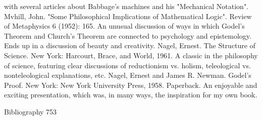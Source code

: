   with several articles about Babbage's machines and his "Mechanical Notation".
Mvhill, John. "Some Philosophical Implications of Mathematical Logic". Review of
  Metaphysics 6 (1952): 165. An unusual discussion of ways in which Godel's Theorem
  and Church's Theorem are connected to psychology and epistemology. Ends up in a
  discussion of beauty and creativity.
Nagel, Ernest. The Structure of Science. New York: Harcourt, Brace, and World, 1961. A
  classic in the philosophy of science, featuring clear discussions of reductionism vs.
  holism, teleological vs. nonteleological explanations, etc.
Nagel, Ernest and James R. Newman. Godel's Proof. New York: New York University
  Press, 1958. Paperback. An enjoyable and exciting presentation, which was, in many
  ways, the inspiration for my own book.

Bibliography                                                                             753

